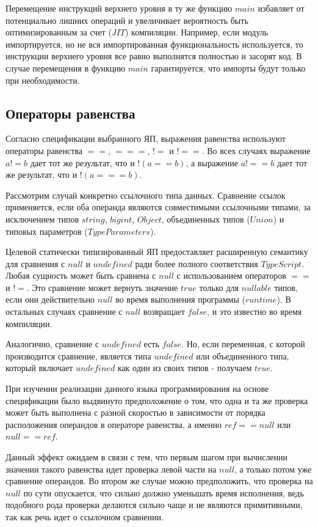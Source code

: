 \documentclass{mipt-thesis-bs}
\begin{document}
Перемещение инструкций верхнего уровня
в ту же функцию $main$ избавляет от потенциально лишних операций
и увеличивает вероятность быть оптимизированным за счет
($JIT$) \cite{jvm-spec} компиляции.
Например, если модуль импортируется, но не вся импортированная
функциональность используется, то инструкции верхнего уровня все
равно выполнятся полностью и засорят код. В случае перемещения в
функцию $main$ гарантируется, что импорты будут только
при необходимости.

\subsection{Операторы равенства}

Согласно спецификации выбранного ЯП, выражения равенства
используют операторы равенства $==$, $===$, $!=$ и $!==$.
Во всех случаях выражение $a != b$ дает тот же результат,
что и $!(a == b)$, а выражение $a !== b$ дает тот же результат, что и $!(a === b)$.

Рассмотрим случай конкретно ссылочного типа данных. Сравнение ссылок применяется,
если оба операнда являются совместимыми ссылочными типами,
за исключением типов $string$, $bigint$, $Object$, объединенных типов
($Union$) и типовых параметров ($Type Parameters$).

Целевой статически типизированный ЯП предоставляет
расширенную семантику для сравнения с $null$ и $undefined$
ради более полного соответствия $TypeScript$. Любая сущность может
быть сравнена с $null$ с использованием операторов $==$ и $!=$. Это
сравнение может вернуть значение $true$ только для $nullable$ типов,
если они действительно $null$ во время выполнения
программы ($runtime$). В остальных случаях сравнение с $null$ возвращает $false$,
и это известно во время компиляции.

Аналогично, сравнение с $undefined$ есть $false$. Но, если
переменная, с которой производится сравнение, является типа
$undefined$ или объединенного типа, который включает
$undefined$ как один из своих типов - получаем $true$.

При изучении реализации данного языка программирования на основе
спецификации было выдвинуто предположение о том,
что одна и та же проверка может быть выполнена с разной скоростью в
зависимости от порядка расположения операндов в операторе равенства, а
именно $ref == null$ или $null == ref$.

Данный эффект ожидаем в связи с тем, что первым шагом при вычислении
значении такого равенства идет проверка левой части на $null$, а
только потом уже сравнение операндов. Во втором же случае можно
предположить, что проверка на $null$ по сути опускается, что сильно
должно уменьшать время исполнения, ведь подобного рода проверки делаются
сильно чаще и не являются примитивными, так как речь идет о ссылочном
сравнении.
\end{document}
